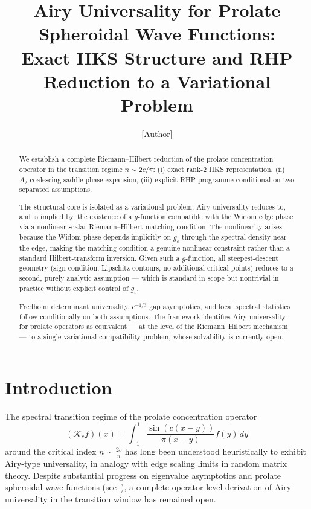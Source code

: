 \documentclass[12pt,a4paper]{amsart}
\theoremstyle{definition}
\theoremstyle{remark}
\newcommand{\Kc}{\mathcal{K}_c}
\begin{document}
\title[Operator Universality for the PSWF Transition Regime]{%
  Airy Universality for Prolate Spheroidal Wave Functions:\\
  Exact IIKS Structure and RHP Reduction to a Variational Problem}

\author{[Author]}
\address{[Address]}
\email{[Email]}

\begin{abstract}
We establish a complete Riemann--Hilbert reduction of the prolate
concentration operator in the transition regime $n\sim 2c/\pi$:
(i) exact rank-2 IIKS representation, (ii) $A_2$ coalescing-saddle
phase expansion, (iii) explicit RHP programme conditional on two
separated assumptions.

The structural core is isolated as a variational problem: Airy
universality reduces to, and is implied by, the existence of a
$g$-function compatible with the Widom edge phase via a nonlinear
scalar Riemann--Hilbert matching condition. The nonlinearity arises
because the Widom phase depends implicitly on $g_c$ through the
spectral density near the edge, making the matching condition a
genuine nonlinear constraint rather than a standard Hilbert-transform
inversion. Given such a $g$-function, all steepest-descent geometry
(sign condition, Lipschitz contours, no additional critical points)
reduces to a second, purely analytic assumption --- which is standard
in scope but nontrivial in practice without explicit control of $g_c$.

Fredholm determinant universality, $c^{-1/3}$ gap asymptotics, and
local spectral statistics follow conditionally on both assumptions.
The framework identifies Airy universality for prolate operators as
equivalent --- at the level of the Riemann--Hilbert mechanism --- to
a single variational compatibility problem, whose solvability is
currently open.
\end{abstract}

\maketitle

\section{Introduction}
\label{sec:intro}

The spectral transition regime of the prolate concentration operator
\[
  (\Kc f)(x) = \int_{-1}^1 \frac{\sin(c(x-y))}{\pi(x-y)} f(y)\,dy
\]
around the critical index $n \sim \frac{2c}{\pi}$ has long been
understood heuristically to exhibit Airy-type universality,
in analogy with edge scaling limits in random matrix theory.
Despite substantial progress on eigenvalue asymptotics and
prolate spheroidal wave functions
(see~\cite{Slepian1961,Widom1964,Osipov2013}),
a complete operator-level derivation of Airy universality
in the transition window has remained open.
\end{document}
